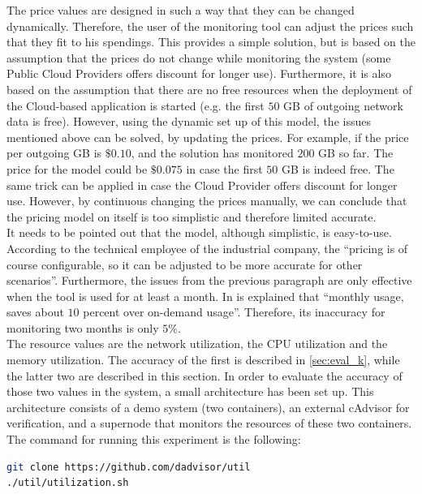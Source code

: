 \noindent
The price values are designed in such a way that they can be changed dynamically. Therefore, the user of the monitoring tool can adjust the prices such that they fit to his spendings. This provides a simple solution, but is based on the assumption that the prices do not change while monitoring the system (some Public Cloud Providers offers discount for longer use). Furthermore, it is also based on the assumption that there are no free resources when the deployment of the Cloud-based application is started (e.g. the first $50$ GB of outgoing network data is free). However, using the dynamic set up of this model, the issues mentioned above can be solved, by updating the prices. For example, if the price per outgoing GB is $\$0.10$, and the solution has monitored $200$ GB so far. The price for the model could be $\$0.075$ in case the first $50$ GB is indeed free. The same trick can be applied in case the Cloud Provider offers discount for longer use. However, by continuous changing the prices manually, we can conclude that the pricing model on itself is too simplistic and therefore limited accurate.\\

\noindent
It needs to be pointed out that the model, although simplistic, is easy-to-use. According to the technical employee of the industrial company, the ``pricing is of course configurable, so it can be adjusted to be more accurate for other scenarios''. Furthermore, the issues from the previous paragraph are only effective when the tool is used for at least a month. In \cite{infoworld} is explained that ``monthly usage, saves about $10$ percent over on-demand usage''. Therefore, its inaccuracy for monitoring two months is only $5\%$.\\

\noindent
The resource values are the network utilization, the CPU utilization and the memory utilization. The accuracy of the first is described in \autoref{sec:eval_k}, while the latter two are described in this section. In order to evaluate the accuracy of those two values in the system, a small architecture has been set up. This architecture consists of a demo system (two containers), an external cAdvisor for verification, and a supernode that monitors the resources of these two containers. The command for running this experiment is the following:

\begin{lstlisting}[language=bash, caption=Docker-compose]
git clone https://github.com/dadvisor/util
./util/utilization.sh
\end{lstlisting}

